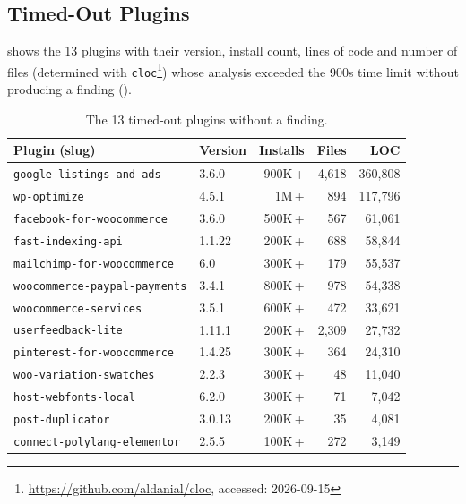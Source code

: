\documentclass[sigconf]{acmart}
\begin{document}
\subsection{Timed-Out Plugins}\label{app:timeoutedplugins}
 shows the 13 plugins with their version, install count, lines of code and number of files (determined with \texttt{cloc}\footnote{\url{https://github.com/aldanial/cloc}, accessed: 2026-09-15}) whose analysis exceeded the
900s time limit without producing a finding ().
\begin{table}[h]
\centering
\caption{The 13 timed-out plugins without a finding.}
\label{tab:timeouts}
\small
\setlength{\tabcolsep}{5pt}
\begin{tabular}{@{}llrrr@{}}
\toprule
\textbf{Plugin (slug)} & \textbf{Version} & \textbf{Installs} & \textbf{Files} & \textbf{LOC} \\
\midrule
\texttt{google-listings-and-ads}     & 3.6.0  & 900K\,+ & 4,618 & 360,808 \\
\texttt{wp-optimize}                 & 4.5.1  & 1M\,+   &   894 & 117,796 \\
\texttt{facebook-for-woocommerce}    & 3.6.0  & 500K\,+ &   567 &  61,061 \\
\texttt{fast-indexing-api}           & 1.1.22 & 200K\,+ &   688 &  58,844 \\
\texttt{mailchimp-for-woocommerce}   & 6.0    & 300K\,+ &   179 &  55,537 \\
\texttt{woocommerce-paypal-payments} & 3.4.1  & 800K\,+ &   978 &  54,338 \\
\texttt{woocommerce-services}        & 3.5.1  & 600K\,+ &   472 &  33,621 \\
\texttt{userfeedback-lite}           & 1.11.1 & 200K\,+ & 2,309 &  27,732 \\
\texttt{pinterest-for-woocommerce}   & 1.4.25 & 300K\,+ &   364 &  24,310 \\
\texttt{woo-variation-swatches}      & 2.2.3  & 300K\,+ &    48 &  11,040 \\
\texttt{host-webfonts-local}         & 6.2.0  & 300K\,+ &    71 &   7,042 \\
\texttt{post-duplicator}             & 3.0.13 & 200K\,+ &    35 &   4,081 \\
\texttt{connect-polylang-elementor}  & 2.5.5  & 100K\,+ &   272 &   3,149 \\
\bottomrule
\end{tabular}
\end{table}
\end{document}
